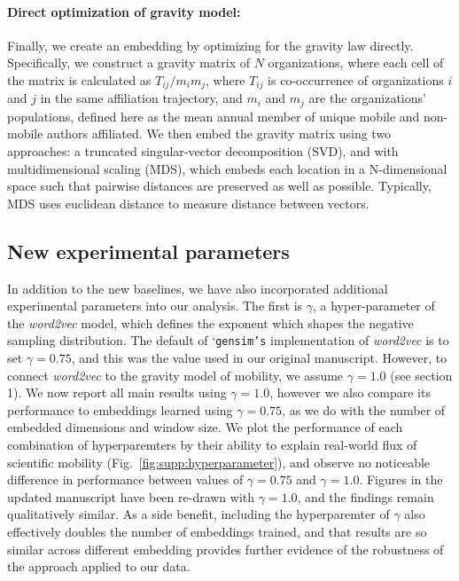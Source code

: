 \documentclass[12pt,a4paper]{article}
\begin{document}
\vspace{-0.3cm}
\paragraph{Direct optimization of gravity model:} Finally, we create an embedding by optimizing for the gravity law directly. 
Specifically, we construct a gravity matrix of $N$ organizations, where each cell of the matrix is calculated as $T_{ij}/m_i m_j$, where $T_{ij}$ is co-occurrence of organizations $i$ and $j$ in the same affiliation trajectory, and $m_i$ and $m_j$ are the organizations' populations, defined here as the mean annual member of unique mobile and non-mobile authors affiliated. We then embed the gravity matrix using two approaches: a truncated singular-vector decomposition (SVD), and with multidimensional scaling (MDS), which embeds each location in a N-dimensional space such that pairwise distances are preserved as well as possible. 
Typically, MDS uses euclidean distance to measure distance between vectors. 

\subsection{New experimental parameters}
In addition to the new baselines, we have also incorporated additional experimental parameters into our analysis.
The first is $\gamma$, a hyper-parameter of the \textit{word2vec} model, which defines the exponent which shapes the negative sampling distribution.
The default of `\texttt{gensim's} implementation of \textit{word2vec} is to set $\gamma = 0.75$, and this was the value used in our original manuscript.
However, to connect \textit{word2vec} to the gravity model of mobility, we assume $\gamma = 1.0$ (see section 1).
We now report all main results using $\gamma = 1.0$, however we also compare its performance to embeddings learned using $\gamma = 0.75$, as we do with the number of embedded dimensions and window size.
We plot the performance of each combination of hyperparemters by their ability to explain real-world flux of scientific mobility (Fig.~\ref{fig:supp:hyperparameter}), and observe no noticeable difference in performance between values of $\gamma = 0.75$ and $\gamma = 1.0$. 
Figures in the updated manuscript have been re-drawn with $\gamma = 1.0$, and the findings remain qualitatively similar.
As a side benefit, including the hyperparemter of $\gamma$ also effectively doubles the number of embeddings trained, and that results are so similar across different embedding provides further evidence of the robustness of the approach applied to our data.
\end{document}

